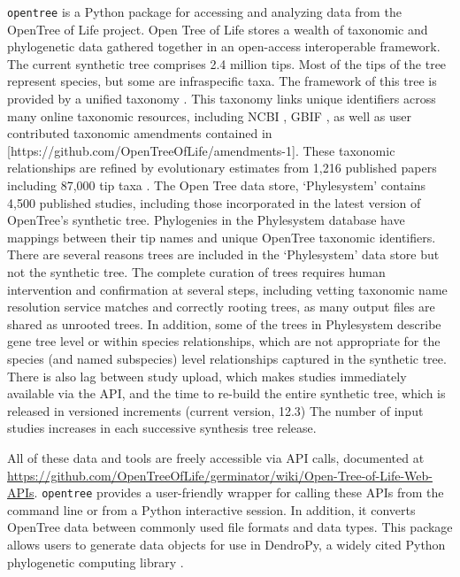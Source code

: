 \documentclass[oupdraft]{sysbio_sse}
\begin{document}
\texttt{opentree} is a Python package for accessing and analyzing data from the OpenTree of Life project.
Open Tree of Life stores a wealth of taxonomic and phylogenetic data gathered together in an open-access interoperable framework.
The current synthetic tree \citep{opentreeoflife_open_2019} comprises 2.4 million tips.
Most of the tips of the tree represent species, but some are infraspecific taxa.
The framework of this tree is provided by a unified taxonomy \citep{opentreeoflife_open_2019-1, rees_automated_2017}.
This taxonomy links unique identifiers across many online taxonomic resources, including NCBI \citep{federhen_ncbi_2012}, GBIF \citep{gbif_secretariat_gbif_2019}, as well as user contributed taxonomic amendments contained in [https://github.com/OpenTreeOfLife/amendments-1].
These taxonomic relationships are refined by evolutionary estimates from 1,216 published papers including 87,000 tip taxa \citep{opentreeoflife_open_2019, redelings_supertree_2017}.
The Open Tree data store, `Phylesystem' \citep{mctavish_phylesystem_2015} contains 4,500 published studies, including those incorporated in the latest version of OpenTree's synthetic tree.
Phylogenies in the Phylesystem database have mappings between their tip names and unique OpenTree taxonomic identifiers.
There are several reasons trees are included in the `Phylesystem' data store but not the synthetic tree.
The complete curation of trees requires human intervention and confirmation at several steps, including vetting taxonomic name resolution service matches and correctly rooting trees, as many output files are shared as unrooted trees.
In addition, some of the trees in Phylesystem describe gene tree level or within species relationships, which are not appropriate for the species (and named subspecies) level relationships captured in the synthetic tree.
There is also lag between study upload, which makes studies immediately available via the API, and the time to re-build the entire synthetic tree, which is released in versioned increments (current version, 12.3)
The number of input studies increases in each successive synthesis tree release.

All of these data and tools are freely accessible via API calls, documented at \url{https://github.com/OpenTreeOfLife/germinator/wiki/Open-Tree-of-Life-Web-APIs}.
\texttt{opentree} provides a user-friendly wrapper for calling these APIs from the command line or from a Python interactive session.
In addition, it converts OpenTree data between commonly used file formats and data types.
This package allows users to generate data objects for use in DendroPy, a widely cited Python phylogenetic computing library \citep{sukumaran_dendropy_2010}.
\end{document}
